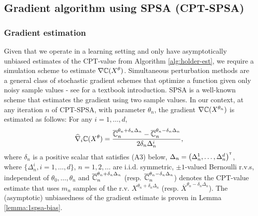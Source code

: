 \subsection{Gradient algorithm using SPSA (CPT-SPSA)}
\label{sec:1spsa}

\subsubsection*{Gradient estimation} 
Given that we operate in a learning setting and only have asymptotically unbiased estimates of the CPT-value from Algorithm \ref{alg:holder-est}, we require a simulation scheme to estimate $\nabla \mathbb{C}(X^\theta)$.  
Simultaneous perturbation methods are a general class of stochastic gradient schemes that optimize a function given only noisy sample values - see \cite{Bhatnagar13SR} for a textbook introduction. SPSA is a well-known scheme that estimates the gradient using two sample values. In our context, at any iteration $n$ of CPT-SPSA, with parameter $\theta_n$, the gradient $\nabla \mathbb{C}(X^{\theta_n})$ is estimated as follows: For any  $i=1,\ldots,d$,
\begin{align}
\widehat \nabla_{i} \mathbb{C}(X^\theta) = \dfrac{\overline {\mathbb{C}}_n^{\theta_n+\delta_n \Delta_n} - \overline {\mathbb{C}}_n^{\theta_n-\delta_n \Delta_n}}{2 \delta_n \Delta_n^{i}},\label{eq:grad-est-spsa}
\end{align}
where $\delta_n$ is a positive scalar that satisfies (A3) below, $\Delta_n = \left( \Delta_n^{1},\ldots,\Delta_n^{d}\right)^\mathsf{\scriptscriptstyle T}$, where $\{\Delta_n^{i}, i=1,\ldots,d\}$, $n=1,2,\ldots$ are i.i.d. symmetric, $\pm 1$-valued Bernoulli r.v.s, independent of $\theta_0,\ldots,\theta_n$ and $\overline {\mathbb{C}}_n^{\theta_n+\delta_n \Delta_n}$ (resp. $\overline {\mathbb{C}}_n^{\theta_n-\delta_n \Delta_n}$) denotes the CPT-value estimate that uses $m_n$ samples of the r.v. $X^{\theta_n+\delta_n \Delta_n}$ (resp. $\overline X^{\theta_n-\delta_n \Delta_n}$).
The (asymptotic) unbiasedness of the gradient estimate is proven in Lemma \ref{lemma:1spsa-bias}.



